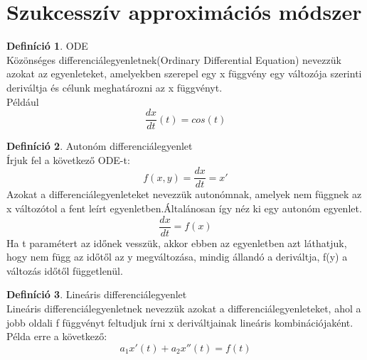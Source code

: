 \documentclass{article}
\theoremstyle{definition}
\theoremstyle{theorem}
\newtheorem{definition}{Definíció}
\begin{document}
\section{Szukcesszív approximációs módszer}

\begin{definition}{ODE}\\
Közönséges differenciálegyenletnek(Ordinary Differential Equation) nevezzük azokat az egyenleteket, amelyekben szerepel egy x függvény egy változója szerinti deriváltja és célunk meghatározni az x függvényt.\\
Például
\begin{equation*}
    \frac{dx}{dt} (t) = cos(t)
\end{equation*}
\end{definition}

\begin{definition}Autonóm differenciálegyenlet\\
Írjuk fel a következő ODE-t:
\begin{equation*}
    f(x,y) = \frac{dx}{dt} = x'
\end{equation*}
Azokat a differenciálegyenleteket nevezzük autonómnak, amelyek nem függnek az x változótol a fent leírt egyenletben.Általánosan így néz ki egy autonóm egyenlet.
\begin{equation*}
    \frac{dx}{dt} = f(x)
\end{equation*}
Ha t paramétert az időnek vesszük, akkor ebben az egyenletben azt láthatjuk, hogy nem függ az időtől az y megváltozása, mindig állandó a deriváltja, f(y) a változás időtől függetlenül.
\end{definition}

\begin{definition}Lineáris differenciálegyenlet\\
Lineáris differenciálegyenletnek nevezzük azokat a differenciálegyenleteket, ahol a jobb oldali f függvényt feltudjuk írni x deriváltjainak lineáris kombinációjaként.
Példa erre a következő:
\begin{equation*}
    a_1 x'(t) + a_2 x''(t) = f(t)
\end{equation*}
\end{definition}
\end{document}
